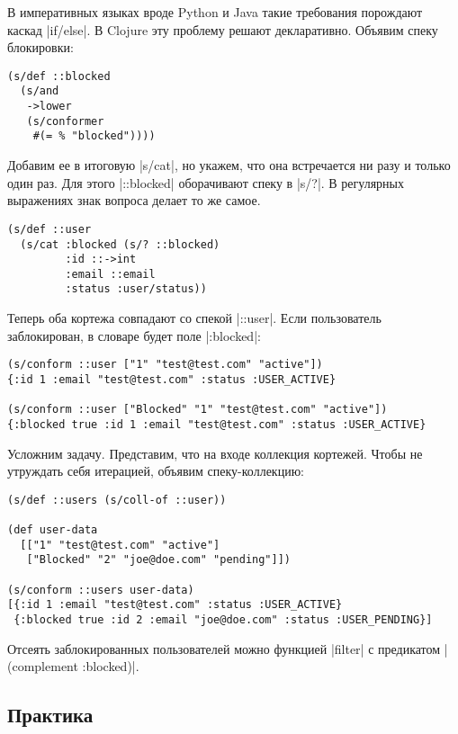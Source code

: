 В императивных языках вроде Python и Java такие требования порождают каскад
\spverb|if/else|. В Clojure эту проблему решают декларативно. Объявим спеку
блокировки:

\begin{verbatim}
(s/def ::blocked
  (s/and
   ->lower
   (s/conformer
    #(= % "blocked"))))
\end{verbatim}

Добавим ее в итоговую \spverb|s/cat|, но укажем, что она встречается ни разу и
только один раз. Для этого \spverb|::blocked| оборачивают спеку в \spverb|s/?|.
В регулярных выражениях знак вопроса делает то же самое.

\begin{verbatim}
(s/def ::user
  (s/cat :blocked (s/? ::blocked)
         :id ::->int
         :email ::email
         :status :user/status))
\end{verbatim}

Теперь оба кортежа совпадают со спекой \spverb|::user|. Если пользователь
заблокирован, в словаре будет поле \spverb|:blocked|:

\begin{verbatim}
(s/conform ::user ["1" "test@test.com" "active"])
{:id 1 :email "test@test.com" :status :USER_ACTIVE}

(s/conform ::user ["Blocked" "1" "test@test.com" "active"])
{:blocked true :id 1 :email "test@test.com" :status :USER_ACTIVE}
\end{verbatim}

Усложним задачу. Представим, что на входе коллекция кортежей. Чтобы не утруждать
себя итерацией, объявим спеку-коллекцию:

\begin{verbatim}
(s/def ::users (s/coll-of ::user))

(def user-data
  [["1" "test@test.com" "active"]
   ["Blocked" "2" "joe@doe.com" "pending"]])

(s/conform ::users user-data)
[{:id 1 :email "test@test.com" :status :USER_ACTIVE}
 {:blocked true :id 2 :email "joe@doe.com" :status :USER_PENDING}]
\end{verbatim}

Отсеять заблокированных пользователей можно функцией \spverb|filter| с
предикатом \spverb|(complement :blocked)|.

\subsection{Практика}

